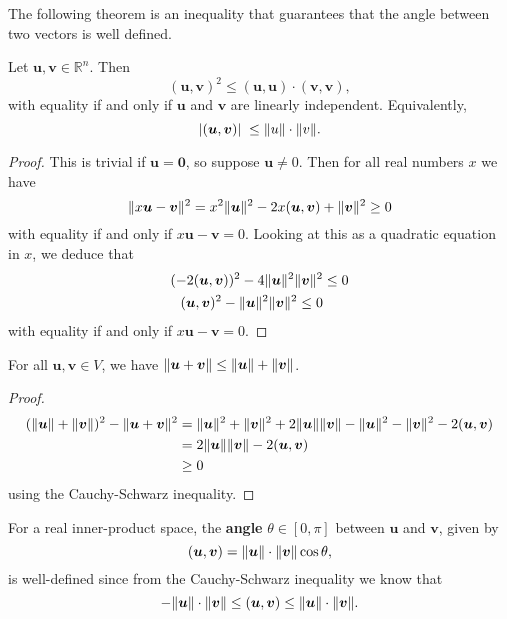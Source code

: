 The following theorem is an inequality that guarantees that the angle between two vectors is well defined.

\begin{theorem} 
    Let $\bm{u}, \bm{v} \in \mathbb{R}^n$. Then \[ (\bm{u}, \bm{v})^2 \leq (\bm{u}, \bm{u}) \cdot (\bm{v}, \bm{v}), \] with equality if and only if $\bm{u}$ and $\bm{v}$ are linearly independent. Equivalently, \[ |(\bm{u}, \bm{v})| \; \leq \lVert u\rVert \cdot \lVert v\rVert. \]
\end{theorem}

\begin{proof}
    This is trivial if $\bm{u} = \bm{0}$, so suppose $\bm{u} \neq 0$. Then for all real numbers $x$ we have \[ \lVert x \bm{u} - \bm{v}\rVert^2 = x^2 \lVert\bm{u}\rVert^2 - 2x (\bm{u}, \bm{v}) + \lVert\bm{v}\rVert^2 \geq 0 \] with equality if and only if $x \bm{u} - \bm{v} = 0$. Looking at this as a quadratic equation in $x$, we deduce that 
    \begin{align*}
        (-2(\bm{u}, \bm{v}))^2 - 4 \lVert\bm{u}\rVert^2 \lVert\bm{v}\rVert^2 &\leq 0 \\
        (\bm{u}, \bm{v})^2 - \lVert\bm{u}\rVert^2\lVert\bm{v}\rVert^2 \leq 0 \\
    \end{align*}
    with equality if and only if $x \bm{u} - \bm{v} = 0$.
\end{proof}

\begin{corollary}
    For all $\bm{u}, \bm{v} \in V$, we have $\lVert\bm u + \bm v\rVert \leq \lVert\bm u\rVert + \lVert\bm v\rVert$.
\end{corollary}

\begin{proof}
    \begin{align*}
        (\lVert\bm u\rVert + \lVert\bm v\rVert)^2 - \lVert\bm u + \bm v\rVert^2 &= \lVert\bm u\rVert^2 + \lVert\bm v\rVert^2 + 2 \lVert\bm u\rVert \lVert\bm v\rVert - \lVert\bm u\rVert^2 - \lVert\bm v\rVert^2 - 2 (\bm u, \bm v) \\
        &= 2 \lVert\bm u\rVert \lVert\bm v\rVert - 2(\bm u, \bm v) \\
        &\geq 0
    \end{align*}
    using the Cauchy-Schwarz inequality.
\end{proof}

\begin{corollary}
    For a real inner-product space, the \textbf{angle} $\theta \in [0, \pi]$ between $\bm u$ and $\bm v$, given by \[ (\bm u, \bm v) = \lVert\bm u\rVert \cdot \lVert\bm v\rVert \cos{\theta}, \] is well-defined since from the Cauchy-Schwarz inequality we know that \[ - \lVert\bm u\rVert \cdot \lVert\bm v\rVert \leq (\bm u, \bm v) \leq \lVert\bm u\rVert \cdot \lVert\bm v\rVert. \] 
\end{corollary}

